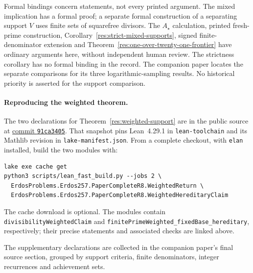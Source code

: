 \documentclass[11pt]{article}
\begin{document}
Formal bindings concern statements, not every printed argument. The mixed
implication has a formal proof; a separate formal construction of a
separating support $V$ uses finite sets of squarefree divisors. The $A_\star$ calculation, printed fresh-prime
construction, Corollary~\ref{res:strict-mixed-supports}, signed
finite-denominator extension and Theorem~\ref{res:one-over-twenty-one-frontier}
have ordinary arguments here, without independent human review. The
strictness corollary has no formal binding in the record. The companion paper locates
the separate comparisons for its three logarithmic-sampling results.
No historical priority is asserted for the support comparison.

\paragraph{Reproducing the weighted theorem.}
The two declarations for Theorem~\ref{res:weighted-support} are in
the public source at
\href{https://github.com/wcook04/plectis-erdos/tree/91ca3405b795a520825ac5ca04dcd591b9ddf3e3}{commit \texttt{91ca3405}}.
That snapshot pins Lean~4.29.1 in \texttt{lean-toolchain} and its Mathlib
revision in \texttt{lake-manifest.json}.  From a complete checkout, with
\texttt{elan} installed, build the two modules with:
\begin{verbatim}
lake exe cache get
python3 scripts/lean_fast_build.py --jobs 2 \
  ErdosProblems.Erdos257.PaperCompleteR8.WeightedReturn \
  ErdosProblems.Erdos257.PaperCompleteR8.WeightedHereditaryClaim
\end{verbatim}
The cache download is optional.  The modules contain
\texttt{divisibilityWeightedClaim} and
\texttt{finitePrimeWeighted\_fixedBase\_hereditary}, respectively; their precise statements and associated checks are linked above.

The supplementary declarations are collected in
{the companion paper's final source section}, grouped by support criteria,
finite denominators, integer recurrences and achievement sets.
\end{document}
